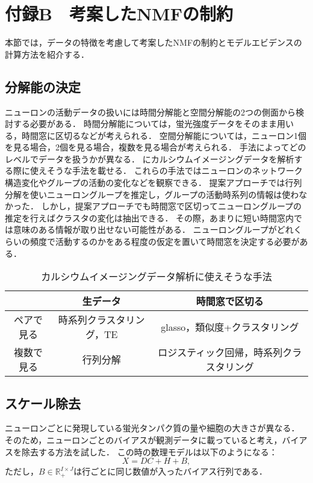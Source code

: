 \chapter{付録B　考案したNMFの制約}
本節では，データの特徴を考慮して考案したNMFの制約とモデルエビデンスの計算方法を紹介する．

\section{分解能の決定}
ニューロンの活動データの扱いには時間分解能と空間分解能の2つの側面から検討する必要がある．
時間分解能については，蛍光強度データをそのまま用いる，時間窓に区切るなどが考えられる．
空間分解能については，ニューロン1個を見る場合，2個を見る場合，複数を見る場合が考えられる．
手法によってどのレベルでデータを扱うかが異なる．
にカルシウムイメージングデータを解析する際に使えそうな手法を載せる．
これらの手法ではニューロンのネットワーク構造変化やグループの活動の変化などを観察できる．
提案アプローチでは行列分解を使いニューロングループを推定し，グループの活動時系列の情報は使わなかった．
しかし，提案アプローチでも時間窓で区切ってニューロングループの推定を行えばクラスタの変化は抽出できる．
その際，あまりに短い時間窓内では意味のある情報が取り出せない可能性がある．
ニューロングループがどれくらいの頻度で活動するのかをある程度の仮定を置いて時間窓を決定する必要がある．

\begin{table}[htb]
  \center
  \begin{tabular}{|c|cc|} \hline
    & 生データ & 時間窓で区切る \\ \hline
    ペアで見る & 時系列クラスタリング，TE & glasso，類似度+クラスタリング\\
	  複数で見る & 行列分解 & ロジスティック回帰，時系列クラスタリング \\ \hline
  \end{tabular}
  \caption{カルシウムイメージングデータ解析に使えそうな手法}
  \label{tab:methods}
\end{table}

\section{スケール除去}
ニューロンごとに発現している蛍光タンパク質の量や細胞の大きさが異なる．
そのため，ニューロンごとのバイアスが観測データに載っていると考え，バイアスを除去する方法を試した．
この時の数理モデルは以下のようになる：
\begin{equation}
	X = DC + H + B,
\end{equation}
ただし，$B \in \mathbb{R}_+^{I\times J}$は行ごとに同じ数値が入ったバイアス行列である．

